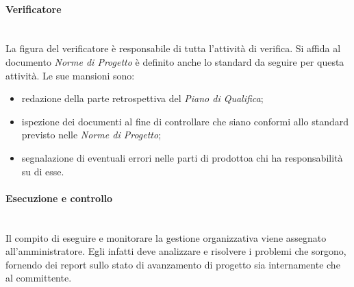 			\paragraph*{Verificatore}\mbox{}\\ [1mm]
				La figura del verificatore è responsabile di tutta l'attività di verifica.
				Si affida al documento \textit{Norme di Progetto} è definito anche lo standard da seguire per questa attività.
				Le sue mansioni sono:
				\begin{itemize}
					\item redazione della parte retrospettiva del \textit{Piano di Qualifica};
					\item ispezione dei documenti al fine di controllare che siano conformi allo standard previsto nelle \textit{Norme di Progetto};
					\item segnalazione di eventuali errori nelle parti di prodotto\glosp a chi ha responsabilità su di esse.
				\end{itemize}
		\paragraph{Esecuzione e controllo} \mbox{}\\ [1mm]
			Il compito di eseguire e monitorare la gestione organizzativa viene assegnato all'amministratore. Egli infatti deve analizzare e risolvere i problemi che sorgono, fornendo dei report sullo stato di avanzamento di progetto sia internamente che al committente.	
